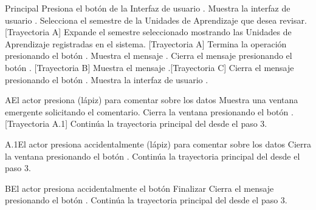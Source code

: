 \begin{UCtrayectoria}{Principal}
    \UCpaso[\UCactor] Presiona el botón  de la Interfaz de usuario  .
    \UCpaso Muestra la interfaz de usuario .
    \UCpaso[\UCactor] Selecciona el semestre de la Unidades de Aprendizaje que desea revisar. [Trayectoria A]
    \UCpaso Expande el semestre seleccionado mostrando las Unidades de Aprendizaje registradas en el sistema. [Trayectoria A]
    \UCpaso[\UCactor] Termina la operación presionando el botón .
    \UCpaso Muestra el mensaje .
    \UCpaso[\UCactor] Cierra el mensaje presionando el botón . [Trayectoria B]
    \UCpaso Muestra el mensaje .[Trayectoria C]
    \UCpaso[\UCactor] Cierra el mensaje presionando el botón .
    \UCpaso Muestra la interfaz de usuario .
\end{UCtrayectoria}
\begin{UCtrayectoriaA}{A}{El actor presiona (lápiz) para comentar sobre los datos}
    \UCpaso Muestra una ventana emergente solicitando el comentario.
    \UCpaso[\UCactor] Cierra la ventana presionando el botón . [Trayectoria A.1]
    \UCpaso Continúa la trayectoria principal del  desde el paso 3.
\end{UCtrayectoriaA}
\begin{UCtrayectoriaA}{A.1}{El actor presiona accidentalmente (lápiz) para comentar sobre los datos}
    \UCpaso[\UCactor] Cierra la ventana presionando el botón .
    \UCpaso Continúa la trayectoria principal del  desde el paso 3.
\end{UCtrayectoriaA}
\begin{UCtrayectoriaA}{B}{El actor presiona accidentalmente el botón Finalizar}
    \UCpaso[\UCactor] Cierra el mensaje presionando el botón .
    \UCpaso Continúa la trayectoria principal del  desde el paso 3.
\end{UCtrayectoriaA}
